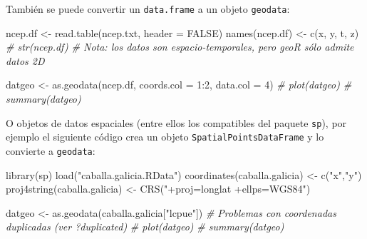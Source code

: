\documentclass[
  spanish,
]{book}
\newenvironment{Shaded}{\begin{snugshade}}{\end{snugshade}}
\newcommand{\AttributeTok}[1]{\textcolor[rgb]{0.77,0.63,0.00}{#1}}
\newcommand{\CommentTok}[1]{\textcolor[rgb]{0.56,0.35,0.01}{\textit{#1}}}
\newcommand{\ConstantTok}[1]{\textcolor[rgb]{0.00,0.00,0.00}{#1}}
\newcommand{\DecValTok}[1]{\textcolor[rgb]{0.00,0.00,0.81}{#1}}
\newcommand{\FunctionTok}[1]{\textcolor[rgb]{0.00,0.00,0.00}{#1}}
\newcommand{\NormalTok}[1]{#1}
\newcommand{\OtherTok}[1]{\textcolor[rgb]{0.56,0.35,0.01}{#1}}
\newcommand{\SpecialCharTok}[1]{\textcolor[rgb]{0.00,0.00,0.00}{#1}}
\newcommand{\StringTok}[1]{\textcolor[rgb]{0.31,0.60,0.02}{#1}}
\theoremstyle{break}
\begin{document}
También se puede convertir un \texttt{data.frame} a un objeto \texttt{geodata}:

\begin{Shaded}
\begin{Highlighting}[]
\NormalTok{ncep.df }\OtherTok{\textless{}{-}} \FunctionTok{read.table}\NormalTok{(}\StringTok{\textquotesingle{}ncep.txt\textquotesingle{}}\NormalTok{, }\AttributeTok{header =} \ConstantTok{FALSE}\NormalTok{)}
\FunctionTok{names}\NormalTok{(ncep.df) }\OtherTok{\textless{}{-}} \FunctionTok{c}\NormalTok{(}\StringTok{\textquotesingle{}x\textquotesingle{}}\NormalTok{, }\StringTok{\textquotesingle{}y\textquotesingle{}}\NormalTok{, }\StringTok{\textquotesingle{}t\textquotesingle{}}\NormalTok{, }\StringTok{\textquotesingle{}z\textquotesingle{}}\NormalTok{)}
\CommentTok{\# str(ncep.df)}
\CommentTok{\# Nota: los datos son espacio{-}temporales, pero geoR sólo admite datos 2D}

\NormalTok{datgeo }\OtherTok{\textless{}{-}} \FunctionTok{as.geodata}\NormalTok{(ncep.df, }\AttributeTok{coords.col =} \DecValTok{1}\SpecialCharTok{:}\DecValTok{2}\NormalTok{, }\AttributeTok{data.col =} \DecValTok{4}\NormalTok{)}
\CommentTok{\# plot(datgeo)}
\CommentTok{\# summary(datgeo)}
\end{Highlighting}
\end{Shaded}

O objetos de datos espaciales (entre ellos los compatibles del paquete \texttt{sp}),
por ejemplo el siguiente código crea un objeto \texttt{SpatialPointsDataFrame}
y lo convierte a \texttt{geodata}:

\begin{Shaded}
\begin{Highlighting}[]
\FunctionTok{library}\NormalTok{(sp)}
\FunctionTok{load}\NormalTok{(}\StringTok{"caballa.galicia.RData"}\NormalTok{)}
\FunctionTok{coordinates}\NormalTok{(caballa.galicia) }\OtherTok{\textless{}{-}} \FunctionTok{c}\NormalTok{(}\StringTok{"x"}\NormalTok{,}\StringTok{"y"}\NormalTok{)}
\FunctionTok{proj4string}\NormalTok{(caballa.galicia) }\OtherTok{\textless{}{-}} \FunctionTok{CRS}\NormalTok{(}\StringTok{"+proj=longlat +ellps=WGS84"}\NormalTok{)}

\NormalTok{datgeo }\OtherTok{\textless{}{-}} \FunctionTok{as.geodata}\NormalTok{(caballa.galicia[}\StringTok{"lcpue"}\NormalTok{])}
\CommentTok{\# Problemas con coordenadas duplicadas  (ver ?duplicated)}
\CommentTok{\# plot(datgeo)}
\CommentTok{\# summary(datgeo)     }
\end{Highlighting}
\end{Shaded}
\end{document}
